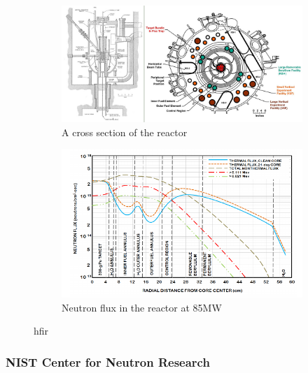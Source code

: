 \begin{figure}[ht]
\centering
\begin{subfigure}{.44\textwidth}
  \centering
    \includegraphics[width=.98\linewidth]{chapters/isotope_activation_and_radioactive_decay/images/hfir-cross-sections.jpg}
    \caption{A cross section of the reactor\cite{hfirornl}}
    \label{fig:hfirxs}
\end{subfigure}
\begin{subfigure}{.44\textwidth}
  \centering
    \includegraphics[width=.98\linewidth]{chapters/isotope_activation_and_radioactive_decay/images/hfirneutronflux.png}
    \caption{Neutron flux in the reactor at 85MW\cite{hfiruserguide}}
    \label{fig:hfirflux}
\end{subfigure}
\caption{\acrlong{hfir}}
\label{fig:hfir}
\end{figure}



\FloatBarrier
\subsubsection{NIST Center for Neutron Research}

